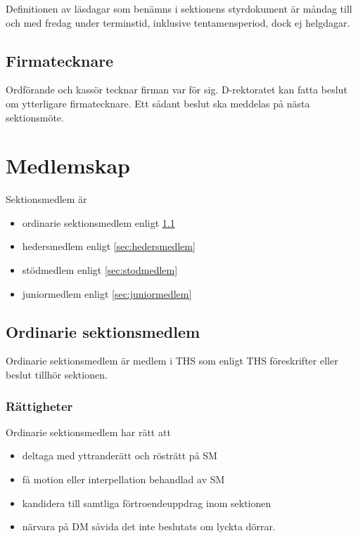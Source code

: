 \documentclass{dgovdoc}
\begin{document}
Definitionen av läsdagar som benämns i sektionens styrdokument är
måndag till och med fredag under terminstid, inklusive tentamensperiod, dock ej helgdagar.

\subsection{Firmatecknare}

Ordförande och kassör tecknar firman var för sig. D-rektoratet kan fatta beslut
om ytterligare firmatecknare. Ett sådant beslut ska meddelas på nästa
sektionsmöte.

\section{Medlemskap}

Sektionsmedlem är

\begin{itemize}
  \item ordinarie sektionsmedlem enligt \ref{sec:ordinarie_sektionsmedlem}
  \item hedersmedlem enligt \ref{sec:hedersmedlem}
  \item stödmedlem enligt \ref{sec:stodmedlem}
  \item juniormedlem enligt \ref{sec:juniormedlem}
\end{itemize}

\subsection{Ordinarie sektionsmedlem}
\label{sec:ordinarie_sektionsmedlem}

Ordinarie sektionsmedlem är medlem i THS som enligt THS föreskrifter eller
beslut tillhör sektionen.

\subsubsection{Rättigheter}

Ordinarie sektionsmedlem har rätt att

\begin{itemize}
  \item deltaga med yttranderätt och rösträtt på SM
  \item få motion eller interpellation behandlad av SM
  \item kandidera till samtliga förtroendeuppdrag inom sektionen
  \item närvara på DM såvida det inte beslutats om lyckta dörrar.
\end{itemize}
\end{document}
